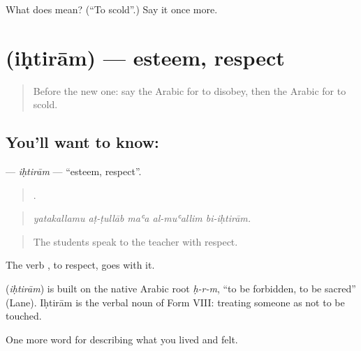 \begin{tcolorbox}[breakable,colback=teal!4,colframe=teal!35!black,title={Before you move on}]
What does  mean? (\textquotedblleft{}To scold\textquotedblright{}.) Say it once more.
\end{tcolorbox}
\section[\texorpdfstring{\ar{احترام} (iḥtirām)}{احترام (iḥtirām)}]{ (iḥtirām) — esteem, respect}

\label{lesson:AR-C534-ihtiram}



\begin{quote}
Before the new one: say the Arabic for to disobey, then the Arabic for to scold.
\end{quote}

\subsection*{You'll want to know: }
\textbf{} — \emph{iḥtirām} — \textquotedblleft{}esteem, respect\textquotedblright{}.

\begin{quote}
    .
\end{quote}

\begin{quote}
\emph{yatakallamu aṭ-ṭullāb maʿa al-muʿallim bi-iḥtirām.}
\end{quote}

\begin{quote}
The students speak to the teacher with respect.
\end{quote}

The verb , to respect, goes with it.

\begin{cousinweb}
\textbf{} (\emph{iḥtirām}) is built on the native Arabic root \emph{ḥ-r-m}, \textquotedblleft{}to be forbidden, to be sacred\textquotedblright{} (Lane). Iḥtirām is the verbal noun of Form VIII: treating someone as not to be touched.
\end{cousinweb}

\begin{grammarlens}[title={What you've built}]
One more word for describing what you lived and felt.
\end{grammarlens}

